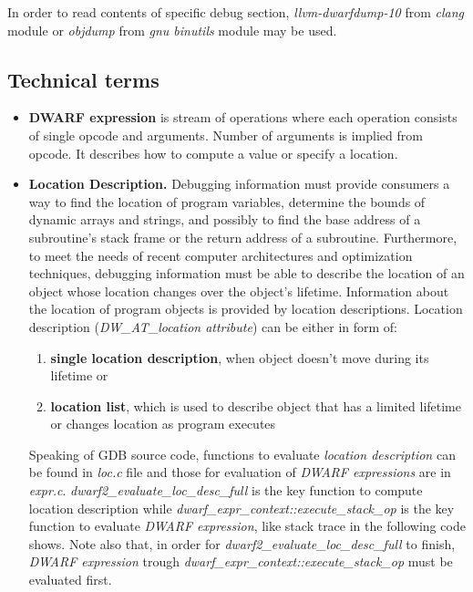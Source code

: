 \documentclass{report}
\begin{document}
	In order to read contents of specific debug section, \textit{llvm-dwarfdump-10} from \textit{clang} module or \textit{objdump} from \textit{gnu binutils} module may be used.

\subsection *{Technical terms}
\begin{itemize}
	\item \textbf{DWARF expression} is stream of operations where each operation consists of single opcode and arguments. Number of arguments is implied from opcode. It describes how to compute a value or specify a location. 
	
	\item \textbf{Location Description.} Debugging information must provide consumers a way to find the location of program variables, determine the bounds of dynamic arrays and strings, and possibly to find the base address of a subroutine’s stack frame or the return address of a subroutine. Furthermore, to meet the needs of recent computer architectures and optimization techniques, debugging information must be able to describe the location of an object whose location changes over the object’s lifetime. Information about the location of program objects is provided by location descriptions.
	Location description (\textit{DW\_AT\_location attribute}) can be either in form of: 
	\begin{enumerate}
		\item \textbf{single location description}, when object doesn't move during its lifetime or 
		\item \textbf{location list}, which is used to describe object that has a limited lifetime or changes location as program executes
	\end{enumerate}

	Speaking of GDB source code, functions to evaluate \textit{location description} can be found in \textit{loc.c} file and those for evaluation of \textit{DWARF expressions} are in \textit{expr.c}.  \textit{dwarf2\_evaluate\_loc\_desc\_full} is the key function to compute location description while \textit{dwarf\_expr\_context::execute\_stack\_op} is the key function to evaluate \textit{DWARF expression}, like stack trace in the following code shows. Note also that, in order for \textit{dwarf2\_evaluate\_loc\_desc\_full} to finish, \textit{DWARF expression} trough \textit{dwarf\_expr\_context::execute\_stack\_op} must be evaluated first.
	

\end{itemize}
\end{document}
